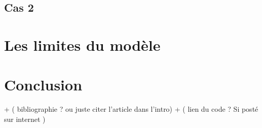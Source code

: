 \documentclass[a4paper,fleqn]{article}
\begin{document}
\subsection{Cas 2} 

\section{Les limites du modèle}


\section{Conclusion} 

+ ( bibliographie ? ou juste citer l'article dans l'intro)
+ ( lien du code ? Si posté sur internet )
 







\end{document}
